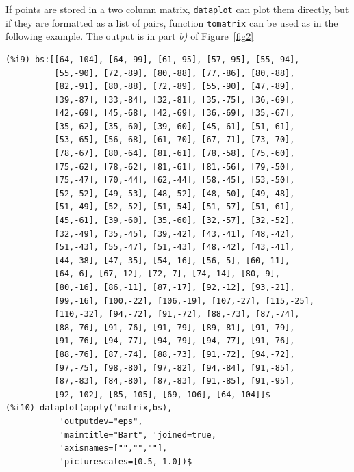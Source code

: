 \documentclass[12pt,a4paper]{article}
\begin{document}
\begin{description}
If points are stored in a two column matrix, \verb|dataplot| can plot them directly, but if they are formatted as a list of pairs, function \verb|tomatrix| can be used as in the following example. The output is in part \emph{b)} of Figure~\ref{fig2}
\begin{verbatim}
(%i9) bs:[[64,-104], [64,-99], [61,-95], [57,-95], [55,-94],
          [55,-90], [72,-89], [80,-88], [77,-86], [80,-88], 
          [82,-91], [80,-88], [72,-89], [55,-90], [47,-89], 
          [39,-87], [33,-84], [32,-81], [35,-75], [36,-69], 
          [42,-69], [45,-68], [42,-69], [36,-69], [35,-67], 
          [35,-62], [35,-60], [39,-60], [45,-61], [51,-61], 
          [53,-65], [56,-68], [61,-70], [67,-71], [73,-70], 
          [78,-67], [80,-64], [81,-61], [78,-58], [75,-60], 
          [75,-62], [78,-62], [81,-61], [81,-56], [79,-50], 
          [75,-47], [70,-44], [62,-44], [58,-45], [53,-50], 
          [52,-52], [49,-53], [48,-52], [48,-50], [49,-48], 
          [51,-49], [52,-52], [51,-54], [51,-57], [51,-61], 
          [45,-61], [39,-60], [35,-60], [32,-57], [32,-52], 
          [32,-49], [35,-45], [39,-42], [43,-41], [48,-42], 
          [51,-43], [55,-47], [51,-43], [48,-42], [43,-41], 
          [44,-38], [47,-35], [54,-16], [56,-5], [60,-11], 
          [64,-6], [67,-12], [72,-7], [74,-14], [80,-9], 
          [80,-16], [86,-11], [87,-17], [92,-12], [93,-21], 
          [99,-16], [100,-22], [106,-19], [107,-27], [115,-25], 
          [110,-32], [94,-72], [91,-72], [88,-73], [87,-74], 
          [88,-76], [91,-76], [91,-79], [89,-81], [91,-79], 
          [91,-76], [94,-77], [94,-79], [94,-77], [91,-76], 
          [88,-76], [87,-74], [88,-73], [91,-72], [94,-72], 
          [97,-75], [98,-80], [97,-82], [94,-84], [91,-85], 
          [87,-83], [84,-80], [87,-83], [91,-85], [91,-95], 
          [92,-102], [85,-105], [69,-106], [64,-104]]$
(%i10) dataplot(apply('matrix,bs),
           'outputdev="eps",
           'maintitle="Bart", 'joined=true,
           'axisnames=["","",""],
           'picturescales=[0.5, 1.0])$
\end{verbatim}



\end{description}
\end{document}
